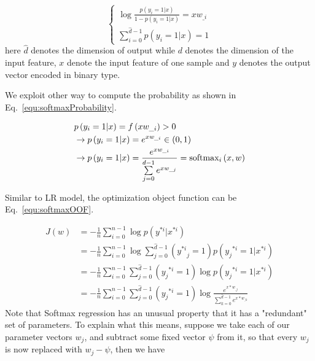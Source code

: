 \documentclass[runningheads,openany]{xhlPaper}
\begin{document}
\begin{equation}
\label{equ:softmaxInsoluble}
\left\{ {\begin{array}{*{20}{c}}
{\log \frac{{{p}\left( {y_i = 1|x} \right)}}{{1 - {p}\left( {y_i = 1|x} \right)}} = x{w_{\_i}}}\\
{\sum\limits_{i = 0}^{{\hat d} - 1} {{p}\left( {y_i = 1|x} \right) = 1} }
\end{array}} \right.
\end{equation} 
here $\hat d$ denotes the dimension of output while $d$ denotes the dimension of the input feature, $x$ denote the input feature of one sample and $y$ denotes the output vector encoded in binary type.

We exploit other way to compute the probability as shown in Eq.~\ref{equ:softmaxProbability}. 

\begin{equation}
\label{equ:softmaxProbability}
\begin{aligned}
&{p}\left( {y_i = 1|x} \right) = f\left( {x{w_{\_i}}} \right) > 0\\
 &\to {p}\left( {y_i = 1|x} \right) = {e^{x{w_{\_i}}}} \in \left( {0,1} \right)\\
 &\to {p}\left( {y_i = 1|x} \right) = \frac{{{e^{x{w_{\_i}}}}}}{{\sum\limits_{j = 0}^{d - 1} {{e^{x{w_{\_j}}}}} }} = {\rm{softma}}{{\rm{x}}_i}\left( {x,w} \right)
\end{aligned}
\end{equation}

Similar to LR model, the optimization object function can be Eq.~\ref{equ:softmaxOOF}.

\begin{equation}
\label{equ:softmaxOOF}
\begin{aligned}
J\left( w \right) &=  - \frac{1}{n}\sum\limits_{i = 0}^{n - 1} {\log p\left( {{y^{*i}}|{x^{*i}}} \right)} \\
 &=  - \frac{1}{n}\sum\limits_{i = 0}^{n - 1} {\log \sum\limits_{j = 0}^{\hat d - 1} {\left( {{y^{*i}}_j = 1} \right){p\left( {{y_j}^{*i} = 1|{x^{*i}}} \right)}}}\\
 &=  - \frac{1}{n}\sum\limits_{i = 0}^{n - 1} {\sum\limits_{j = 0}^{\hat d - 1} {\left( {{y_j}^{*i} = 1} \right)} \log p\left( {{y_j}^{*i} = 1|{x^{*i}}} \right)}\\
 &=  - \frac{1}{n}\sum\limits_{i = 0}^{n - 1} {\sum\limits_{j = 0}^{\hat d - 1} {\left( {{y_j}^{*i} = 1} \right)} \log \frac{{{e^{x*{w_{\_j}}}}}}{{\sum\limits_{k = 0}^{\hat d - 1} {{e^{x*{w_{\_k}}}}} }}}
\end{aligned}
\end{equation}
Note that Softmax regression has an unusual property that it has a "redundant" set of parameters. To explain what this means, suppose we take each of our parameter vectors $w_j$, and subtract some fixed vector $\psi$ from it, so that every $w_j$ is now replaced with $w_j - \psi$, then we have 
\end{document}
